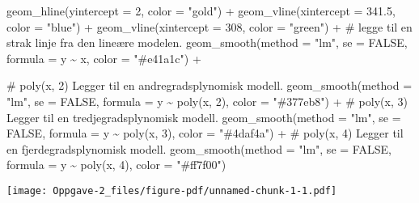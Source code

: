 \documentclass[
  letterpaper,
  DIV=11,
  numbers=noendperiod]{scrreprt}
\newenvironment{Shaded}{\begin{snugshade}}{\end{snugshade}}
\newcommand{\AttributeTok}[1]{\textcolor[rgb]{0.40,0.45,0.13}{#1}}
\newcommand{\CommentTok}[1]{\textcolor[rgb]{0.37,0.37,0.37}{#1}}
\newcommand{\ConstantTok}[1]{\textcolor[rgb]{0.56,0.35,0.01}{#1}}
\newcommand{\DecValTok}[1]{\textcolor[rgb]{0.68,0.00,0.00}{#1}}
\newcommand{\FloatTok}[1]{\textcolor[rgb]{0.68,0.00,0.00}{#1}}
\newcommand{\FunctionTok}[1]{\textcolor[rgb]{0.28,0.35,0.67}{#1}}
\newcommand{\NormalTok}[1]{\textcolor[rgb]{0.00,0.23,0.31}{#1}}
\newcommand{\SpecialCharTok}[1]{\textcolor[rgb]{0.37,0.37,0.37}{#1}}
\newcommand{\StringTok}[1]{\textcolor[rgb]{0.13,0.47,0.30}{#1}}
\begin{document}
\begin{Shaded}
\begin{Highlighting}[]
  \FunctionTok{geom\_hline}\NormalTok{(}\AttributeTok{yintercept =} \DecValTok{2}\NormalTok{, }\AttributeTok{color =} \StringTok{"gold"}\NormalTok{) }\SpecialCharTok{+}
  \FunctionTok{geom\_vline}\NormalTok{(}\AttributeTok{xintercept =} \FloatTok{341.5}\NormalTok{, }\AttributeTok{color =} \StringTok{"blue"}\NormalTok{) }\SpecialCharTok{+}
  \FunctionTok{geom\_vline}\NormalTok{(}\AttributeTok{xintercept =} \DecValTok{308}\NormalTok{, }\AttributeTok{color =} \StringTok{"green"}\NormalTok{) }\SpecialCharTok{+}
  \CommentTok{\# legge til en strak linje fra den lineære modelen.}
  \FunctionTok{geom\_smooth}\NormalTok{(}\AttributeTok{method =} \StringTok{"lm"}\NormalTok{, }\AttributeTok{se =} \ConstantTok{FALSE}\NormalTok{, }\AttributeTok{formula =}\NormalTok{ y }\SpecialCharTok{\textasciitilde{}}\NormalTok{ x, }\AttributeTok{color =} \StringTok{"\#e41a1c"}\NormalTok{) }\SpecialCharTok{+}
  
  \CommentTok{\# poly(x, 2) Legger til en andregradsplynomisk modell.}
  \FunctionTok{geom\_smooth}\NormalTok{(}\AttributeTok{method =} \StringTok{"lm"}\NormalTok{, }\AttributeTok{se =} \ConstantTok{FALSE}\NormalTok{, }\AttributeTok{formula =}\NormalTok{ y }\SpecialCharTok{\textasciitilde{}} \FunctionTok{poly}\NormalTok{(x, }\DecValTok{2}\NormalTok{), }\AttributeTok{color =} \StringTok{"\#377eb8"}\NormalTok{) }\SpecialCharTok{+}
  \CommentTok{\# poly(x, 3) Legger til en tredjegradsplynomisk modell.}
  \FunctionTok{geom\_smooth}\NormalTok{(}\AttributeTok{method =} \StringTok{"lm"}\NormalTok{, }\AttributeTok{se =} \ConstantTok{FALSE}\NormalTok{, }\AttributeTok{formula =}\NormalTok{ y }\SpecialCharTok{\textasciitilde{}} \FunctionTok{poly}\NormalTok{(x, }\DecValTok{3}\NormalTok{), }\AttributeTok{color =} \StringTok{"\#4daf4a"}\NormalTok{) }\SpecialCharTok{+}
  \CommentTok{\# poly(x, 4) Legger til en fjerdegradsplynomisk modell.}
  \FunctionTok{geom\_smooth}\NormalTok{(}\AttributeTok{method =} \StringTok{"lm"}\NormalTok{, }\AttributeTok{se =} \ConstantTok{FALSE}\NormalTok{, }\AttributeTok{formula =}\NormalTok{ y }\SpecialCharTok{\textasciitilde{}} \FunctionTok{poly}\NormalTok{(x, }\DecValTok{4}\NormalTok{), }\AttributeTok{color =} \StringTok{"\#ff7f00"}\NormalTok{)}
\end{Highlighting}
\end{Shaded}

\texttt{[image: Oppgave-2\_files/figure-pdf/unnamed-chunk-1-1.pdf]}
\end{document}
